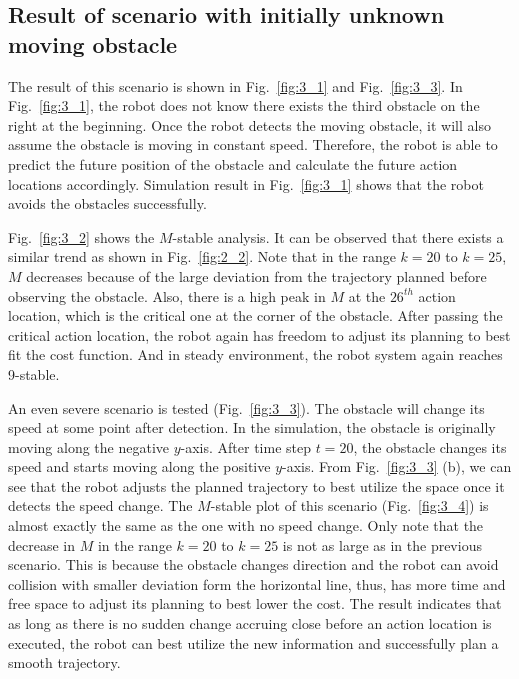 \documentclass{ifacconf}
\begin{document}
\subsection{Result of scenario with initially unknown moving obstacle}

The result of this scenario is shown in Fig.~\ref{fig:3_1} and Fig.~\ref{fig:3_3}. In Fig.~\ref{fig:3_1}, the robot does not know there exists the third obstacle on the right at the beginning. Once the robot detects the moving obstacle, it will also assume the obstacle is moving in constant speed. Therefore, the robot is able to predict the future position of the obstacle and calculate the future action locations accordingly. Simulation result in Fig.~\ref{fig:3_1} shows that the robot avoids the obstacles successfully.

Fig.~\ref{fig:3_2} shows the $M$-stable analysis. It can be observed that there exists a similar trend as shown in Fig.~\ref{fig:2_2}. Note that in the range $k=20$ to $k=25$, $M$ decreases because of the large deviation from the trajectory planned before observing the obstacle. Also, there is a high peak in $M$ at the $26^{th}$ action location, which is the critical one at the corner of the obstacle. After passing the critical action location, the robot again has freedom to adjust its planning to best fit the cost function. And in steady environment, the robot system again reaches 9-stable. 

An even severe scenario is tested (Fig.~\ref{fig:3_3}). The obstacle will change its speed at some point after detection. In the simulation, the obstacle is originally moving along the negative $y$-axis. After time step $t=20$, the obstacle changes its speed and starts moving along the positive $y$-axis. From Fig.~\ref{fig:3_3} (b), we can see that the robot adjusts the planned trajectory to best utilize the space once it detects the speed change. The $M$-stable plot of this scenario (Fig.~\ref{fig:3_4}) is almost exactly the same as the one with no speed change. Only note that the decrease in $M$ in the range $k=20$ to $k=25$ is not as large as in the previous scenario. This is because the obstacle changes direction and the robot can avoid collision with smaller deviation form the horizontal line, thus, has more time and free space to adjust its planning to best lower the cost. The result indicates that as long as there is no sudden change accruing close before an action location is executed, the robot can best utilize the new information and successfully plan a smooth trajectory.
\end{document}
